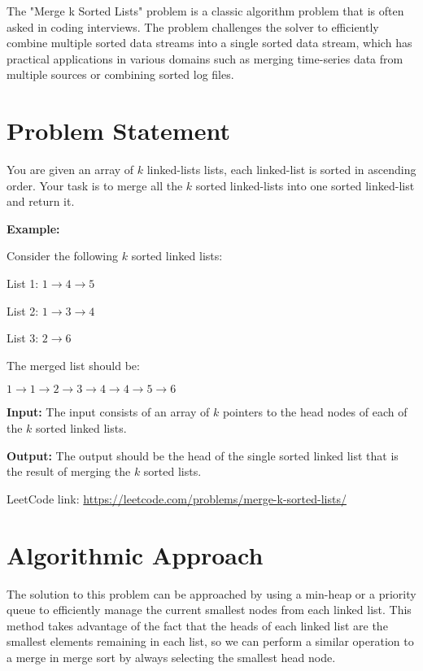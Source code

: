 
\label{problem:Merge_k_Sorted_Lists}
The "Merge k Sorted Lists" problem is a classic algorithm problem that is often asked in coding interviews. The problem challenges the solver to efficiently combine multiple sorted data streams into a single sorted data stream, which has practical applications in various domains such as merging time-series data from multiple sources or combining sorted log files.

\section*{Problem Statement}
You are given an array of \(k\) linked-lists lists, each linked-list is sorted in ascending order. Your task is to merge all the \(k\) sorted linked-lists into one sorted linked-list and return it.

\textbf{Example:}

Consider the following \(k\) sorted linked lists:

List 1: \(1 \rightarrow 4 \rightarrow 5\)

List 2: \(1 \rightarrow 3 \rightarrow 4\)

List 3: \(2 \rightarrow 6\)

The merged list should be:

\(1 \rightarrow 1 \rightarrow 2 \rightarrow 3 \rightarrow 4 \rightarrow 4 \rightarrow 5 \rightarrow 6\)

\textbf{Input:} The input consists of an array of \(k\) pointers to the head nodes of each of the \(k\) sorted linked lists.

\textbf{Output:} The output should be the head of the single sorted linked list that is the result of merging the \(k\) sorted lists.

LeetCode link: \href{https://leetcode.com/problems/merge-k-sorted-lists/}{https://leetcode.com/problems/merge-k-sorted-lists/}

\section*{Algorithmic Approach}
The solution to this problem can be approached by using a min-heap or a priority queue to efficiently manage the current smallest nodes from each linked list. This method takes advantage of the fact that the heads of each linked list are the smallest elements remaining in each list, so we can perform a similar operation to a merge in merge sort by always selecting the smallest head node.

